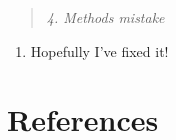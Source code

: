 \documentclass[
]{article}
\providecommand{\tightlist}{%
  \setlength{\itemsep}{0pt}\setlength{\parskip}{0pt}}
\begin{document}
\begin{quote}
\emph{4. Methods mistake}
\end{quote}

\begin{enumerate}
\def\labelenumi{\arabic{enumi}.}
\setcounter{enumi}{3}
\tightlist
\item
  Hopefully I've fixed it!
\end{enumerate}

\newpage

\hypertarget{references}{%
\section*{References}\label{references}}
\end{document}
